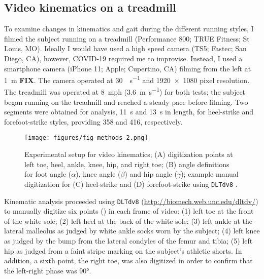 \subsection{Video kinematics on a treadmill}
To examine changes in kinematics and gait during the different running styles, I filmed the subject running on a treadmill (Performance 800; TRUE Fitness; St Louis, MO). Ideally I would have used a high speed camera (TS5; Fastec; San Diego, CA), however, COVID-19 required me to improvise. Instead, I used a smartphone camera (iPhone 11; Apple; Cupertino, CA) filming from the left at \SI{1}{\meter} \textbf{FIX}. The camera operated at \SI{30}{\frame\per\second} and \num{1920x1080} pixel resolution. The treadmill was operated at \SI{8}{mph} (\SI{3.6}{\meter\per\second}) for both tests; the subject began running on the treadmill and reached a steady pace before filming.  Two segments were obtained for analysis, \SI{11}{\second} and \SI{13}{\second} in length, for heel-strike and forefoot-strike styles, providing \SI{358}{\frame} and \SI{416}{\frame}, respectively.
\begin{figure}
\begin{center}
\texttt{[image: figures/fig-methods-2.png]}
\end{center}
\caption{Experimental setup for video kinematics; (A) digitization points at left toe, heel, ankle, knee, hip, and right toe; (B) angle definitions for foot angle ($\alpha$), knee angle ($\beta$) and hip angle ($\gamma$); example manual digitization for (C) heel-strike and (D) forefoot-strike using \lstinline{DLTdv8} \citep{hedrick2008software}.}
\label{fig:methods:kinematics}
\end{figure}

Kinematic analysis proceeded using \citet{hedrick2008software} \lstinline{DLTdv8} (\url{http://biomech.web.unc.edu/dltdv/}) to manually digitize six points () in each frame of video: (1) left toe at the front of the white sole; (2) left heel at the back of the white sole; (3) left ankle at the lateral malleolus as judged by white ankle socks worn by the subject; (4) left knee as judged by the bump from the lateral condyles of the femur and tibia; (5) left hip as judged from a faint stripe marking on the subject's athletic shorts. In addition, a sixth point, the right toe, was also digitized in order to confirm that the left-right phase was \ang{90}. 

